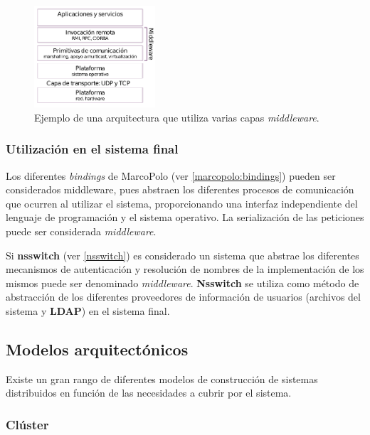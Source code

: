 \begin{figure}[H]
\centering
\includegraphics[width=0.4\textwidth]{Chapter2/Figures/middleware-rodrigo}
\caption{Ejemplo de una arquitectura que utiliza varias capas \textit{middleware}.}
\label{fig:middleware-rodrigo}
\end{figure}

\subsubsection{Utilización en el sistema final}

Los diferentes \textit{bindings} de MarcoPolo (ver \ref{marcopolo:bindings}) pueden ser considerados middleware, pues abstraen los diferentes procesos de comunicación que ocurren al utilizar el sistema, proporcionando una interfaz independiente del lenguaje de programación y el sistema operativo. La serialización de las peticiones puede ser considerada \textit{middleware}.

Si \textbf{nsswitch} (ver \ref{nsswitch}) es considerado un sistema que abstrae los diferentes mecanismos de autenticación y resolución de nombres de la implementación de los mismos puede ser denominado \textit{middleware}. \textbf{Nsswitch} se utiliza como método de abstracción de los diferentes proveedores de información de usuarios (archivos del sistema y \textbf{LDAP}) en el sistema final.

\subsection{Modelos arquitectónicos}

Existe un gran rango de diferentes modelos de construcción de sistemas distribuidos en función de las necesidades a cubrir por el sistema.


\subsubsection{Clúster}

